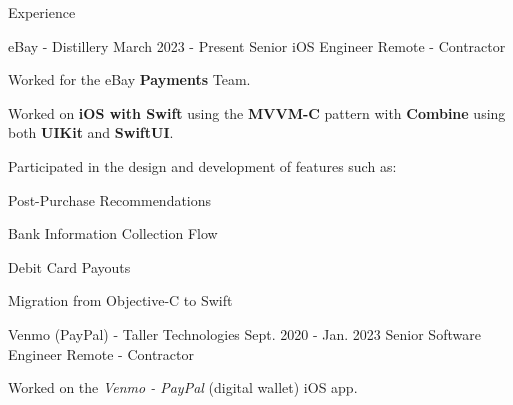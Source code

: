 \documentclass{curriculum}
\begin{document}
\begin{cvsection}{Experience}


    \makesectionitemheader
        {eBay - Distillery}         {March 2023 - Present}
        {Senior iOS Engineer}       {Remote - Contractor}

        \begin{sectionitemlist}

        \item{
            Worked for the eBay \textbf{Payments} Team.
        }

        \item{
            Worked on \textbf{iOS with Swift} using the \textbf{MVVM-C} pattern
            with \textbf{Combine} using both \textbf{UIKit} and \textbf{SwiftUI}.
        }

        \item{
            Participated in the design and development of features such as:
        } {
            \begin{colsectionitemlist}{2}
            \item{Post-Purchase Recommendations}
            \item{Bank Information Collection Flow}
            \item{Debit Card Payouts}
            \item{Migration from Objective-C to Swift}
            \end{colsectionitemlist}
        }

        \end{sectionitemlist}


    \makesectionitemheader
        {Venmo (PayPal) - Taller Technologies}      {Sept. 2020 - Jan. 2023}
        {Senior Software Engineer}                  {Remote - Contractor}

        \begin{sectionitemlist}

        \item{
            Worked on the \textit{Venmo - PayPal} (digital wallet) iOS app.
        }


\end{sectionitemlist}
\end{cvsection}
\end{document}
